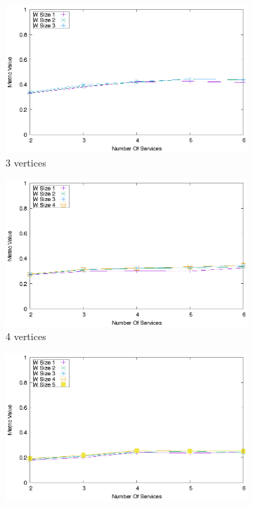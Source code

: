 \begin{figure}[ht!]
  \centering
  \begin{subfigure}{0.33\textwidth}
    \includegraphics[width=\textwidth]{Images/graphs/quality_plot_bad_percentage_n3.eps}
    \caption{3 vertices}
    \label{fig:quality_window_bad_percentage_a}
  \end{subfigure}
  \hfill
  \begin{subfigure}{0.33\textwidth}
    \includegraphics[width=\textwidth]{Images/graphs/quality_plot_bad_percentage_n4.eps}
    \caption{4 vertices}
    \label{fig:quality_window_bad_percentage_b}
  \end{subfigure}
  \hfill
  \begin{subfigure}{0.33\textwidth}
    \includegraphics[width=\textwidth]{Images/graphs/quality_plot_bad_percentage_n5.eps}

\end{subfigure}
\end{figure}
